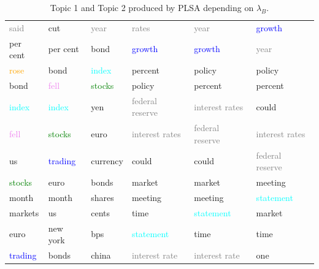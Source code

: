 \documentclass[11pt,a4paper,english,oneside]{book}
\numberwithin{equation}{chapter}
\begin{document}
\begin{table}
\begin{tabular}{ p{3cm}  p{3cm}  p{3cm} | p{3cm}  p{3cm}  p{3cm}}
		  \textcolor{gray}{said}				&cut							&\textcolor{gray}{year} 		& 	\textcolor{gray}{rates}				&\textcolor{gray}{year}			& \textcolor{blue}{growth} \\
		  per cent		  						&per cent 						&bond 							& 	\textcolor{blue}{growth }			&\textcolor{blue}{growth}		& \textcolor{gray}{year}\\
		  \textcolor{orange}{rose }				&bond 							&\textcolor{cyan}{index }		& 	percent 							&policy			 				& policy \\
		  bond 			  						&\textcolor{violet}{fell }		&\textcolor{green}{stocks}		& 	policy 								&percent 						& percent  \\
		  \textcolor{cyan}{index }				&\textcolor{cyan}{index }		&yen 							& 	\textcolor{gray}{federal reserve}	&\textcolor{gray}{interest rates}& could \\
		  \textcolor{violet}{fell } 		 	&\textcolor{green}{stocks}		&euro 							& 	\textcolor{gray}{interest rates}	& \textcolor{gray}{federal reserve}& \textcolor{gray}{interest rates} \\
		  us			  						&\textcolor{blue}{trading}		&currency 						& 	could 								&could 							& \textcolor{gray}{federal reserve}\\
		  \textcolor{green}{stocks}				&euro 							&bonds 							& 	market 								&market 						& meeting \\
		  month									&month 							&shares 						& 	meeting 							&meeting 						& \textcolor{cyan}{statement} \\
		  markets 		  						&us 							&cents 							& 	time								&\textcolor{cyan}{statement}	& market \\
		  euro									&new york						&bps 							& 	\textcolor{cyan}{statement} 		&time 							& time \\
		  \textcolor{blue}{trading}				&bonds							&china 							& 	\textcolor{gray}{interest rate}		&\textcolor{gray}{interest rate}&one  \\		  
		\bottomrule %
	\end{tabular}
	\caption{Topic 1 and Topic 2 produced by PLSA depending on $\lambda_B$.} %
	\label{tab:topics2} %
\end{table}
\end{document}
